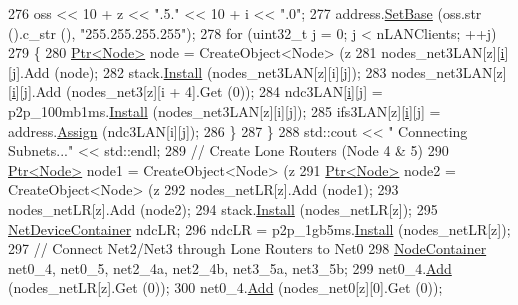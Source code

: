 \begin{DoxyCode}
276           oss << 10 + z << \textcolor{stringliteral}{".5."} << 10 + i << \textcolor{stringliteral}{".0"};
277           address.\hyperlink{classns3_1_1Ipv4AddressHelper_acf7b16dd25bac67e00f5e25f90a9a035}{SetBase} (oss.str ().c\_str (), \textcolor{stringliteral}{"255.255.255.255"});
278           \textcolor{keywordflow}{for} (uint32\_t j = 0; j < nLANClients; ++j)
279             \{
280               \hyperlink{classns3_1_1Ptr}{Ptr<Node>} node = CreateObject<Node> (z %
281               nodes\_net3LAN[z][\hyperlink{bernuolliDistribution_8m_a6f6ccfcf58b31cb6412107d9d5281426}{i}][j].Add (node);
282               stack.\hyperlink{classns3_1_1InternetStackHelper_a6645b412f31283d2d9bc3d8a95cebbc0}{Install} (nodes\_net3LAN[z][i][j]);
283               nodes\_net3LAN[z][\hyperlink{bernuolliDistribution_8m_a6f6ccfcf58b31cb6412107d9d5281426}{i}][j].Add (nodes\_net3[z][i + 4].Get (0));
284               ndc3LAN[\hyperlink{bernuolliDistribution_8m_a6f6ccfcf58b31cb6412107d9d5281426}{i}][j] = p2p\_100mb1ms.\hyperlink{classns3_1_1PointToPointHelper_ab9162fea3e88722666fed1106df1f9ec}{Install} (nodes\_net3LAN[z][i][j]);
285               ifs3LAN[z][\hyperlink{bernuolliDistribution_8m_a6f6ccfcf58b31cb6412107d9d5281426}{i}][j] = address.\hyperlink{classns3_1_1Ipv4AddressHelper_af8e7f4a1a7e74c00014a1eac445a27af}{Assign} (ndc3LAN[i][j]);
286             \}
287         \}
288       std::cout << \textcolor{stringliteral}{"  Connecting Subnets..."} << std::endl;
289       \textcolor{comment}{// Create Lone Routers (Node 4 & 5)}
290       \hyperlink{classns3_1_1Ptr}{Ptr<Node>} node1 = CreateObject<Node> (z %
291       \hyperlink{classns3_1_1Ptr}{Ptr<Node>} node2 = CreateObject<Node> (z %
292       nodes\_netLR[z].Add (node1);
293       nodes\_netLR[z].Add (node2);
294       stack.\hyperlink{classns3_1_1InternetStackHelper_a6645b412f31283d2d9bc3d8a95cebbc0}{Install} (nodes\_netLR[z]);
295       \hyperlink{classns3_1_1NetDeviceContainer}{NetDeviceContainer} ndcLR;
296       ndcLR = p2p\_1gb5ms.\hyperlink{classns3_1_1PointToPointHelper_ab9162fea3e88722666fed1106df1f9ec}{Install} (nodes\_netLR[z]);
297       \textcolor{comment}{// Connect Net2/Net3 through Lone Routers to Net0}
298       \hyperlink{classns3_1_1NodeContainer}{NodeContainer} net0\_4, net0\_5, net2\_4a, net2\_4b, net3\_5a, net3\_5b;
299       net0\_4.\hyperlink{classns3_1_1NodeContainer_aa60b3a0e70f2fb324e16ffcf8bf31fcb}{Add} (nodes\_netLR[z].Get (0));
300       net0\_4.\hyperlink{classns3_1_1NodeContainer_aa60b3a0e70f2fb324e16ffcf8bf31fcb}{Add} (nodes\_net0[z][0].Get (0));

\end{DoxyCode}

